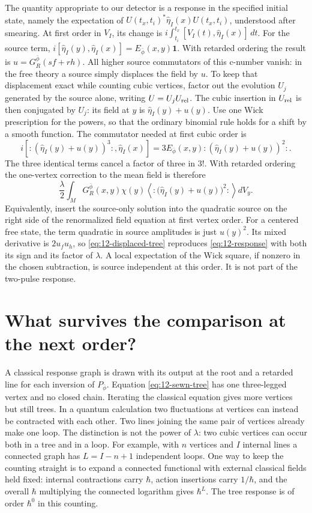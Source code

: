 The quantity appropriate to our detector is a response in the specified
initial state, namely the expectation of
$U(t_x,t_i)^*\widehat\eta_I(x)U(t_x,t_i)$, understood after smearing.
At first order in $V_I$, its change is
$i\int_{t_i}^{t_x}[V_I(t),\widehat\eta_I(x)]\,dt$. For the source term,
$i[\widehat\eta_I(y),\widehat\eta_I(x)]=E_{\bar\phi}(x,y)\mathbf1$.
With retarded ordering the result is $u=G_R^{\bar\phi}(s f+r h)$.
All higher source commutators of this c-number vanish: in the free theory
a source simply displaces the field by $u$. To keep that displacement
exact while counting cubic vertices, factor out the evolution $U_j$
generated by the source alone, writing $U=U_j U_{\rm rel}$. The cubic
insertion in $U_{\rm rel}$ is then conjugated by $U_j$: its field at $y$
is $\widehat\eta_I(y)+u(y)$. Use one Wick prescription for the powers,
so that the ordinary binomial rule holds for a shift by a smooth function.
The commutator needed at first cubic order is
\[
 i[:\!(\widehat\eta_I(y)+u(y))^3\!:,\widehat\eta_I(x)]
 =3 E_{\bar\phi}(x,y):\!(\widehat\eta_I(y)+u(y))^2\!: .
\]
The three identical terms cancel a factor of three in $3!$. With retarded
ordering the one-vertex correction to the mean field is therefore
\begin{equation}
 \frac{\lambda}{2}\int_M G_R^{\bar\phi}(x,y)\chi(y)
  \left\langle :\!\big(\widehat\eta_I(y)+u(y)\big)^2\!:\right\rangle dV_y .
 \label{eq:12-displaced-tree}
\end{equation}
Equivalently, insert the source-only solution into the quadratic source on
the right side of the renormalized field equation at first vertex order.
For a centered free state, the term quadratic in source amplitudes is just
$u(y)^2$. Its mixed derivative is $2u_fu_h$, so
\eqref{eq:12-displaced-tree} reproduces \eqref{eq:12-response} with both
its sign and its factor of $\lambda$. A local expectation of the Wick
square, if nonzero in the chosen subtraction, is source independent at
this order. It is not part of the two-pulse response.

\section{What survives the comparison at the next order?}
A classical response graph is drawn with its output at the root and a
retarded line for each inversion of $P_{\bar\phi}$. Equation
\eqref{eq:12-sewn-tree} has one three-legged vertex and no closed chain.
Iterating the classical equation gives more vertices but still trees. In a
quantum calculation two fluctuations at vertices can instead be contracted
with each other. Two lines joining the same pair of vertices already make
one loop. The distinction is not the power of $\lambda$: two cubic
vertices can occur both in a tree and in a loop. For example, with $n$
vertices and $I$ internal lines a connected graph has $L=I-n+1$ independent
loops. One way to keep the counting straight is to expand a connected
functional with external classical fields held fixed: internal contractions
carry $\hbar$, action insertions carry $1/\hbar$, and the overall
$\hbar$ multiplying the connected logarithm gives $\hbar^L$. The tree
response is of order $\hbar^0$ in this counting.

